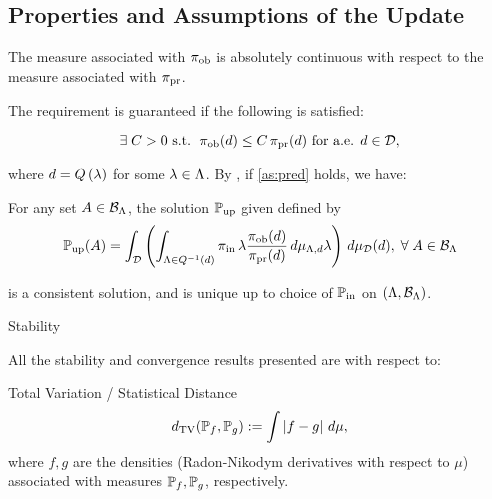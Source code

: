 \subsection{Properties and Assumptions of the Update}
\begin{frame}[t]
\begin{assumption}\label{as:pred}
	The measure associated with $\operatorname*{\pi_{ob}}$ is absolutely continuous with respect to the measure associated with $\operatorname*{\pi_{pr}}$.
\end{assumption}


The requirement is guaranteed if the following is satisfied:

\begin{equation}\label{eq:pred}
	\exists \; C>0 \text{ s.t. } \operatorname*{\pi_{ob}} (d) \leq C \operatorname*{\pi_{pr}} (d) \text{ for a.e. } d\in \mathcal{D},
\end{equation}

where $d = Q\left ( \lambda \right )$ for some $\lambda \in {\Lambda}$.
By \cite{BJW18}, if \eqref{as:pred} holds, we have:

\begin{theorem}
	For any set $A\in \mathcal{B}_{{\Lambda}}$, the solution $\operatorname*{\mathbb{P}_{up}}$ given defined by
	\begin{equation}\label{eq:cb_sol}
		\operatorname*{\mathbb{P}_{up}} (A) = \int_{\mathcal{D}} \left (  \int_{{\Lambda} \in Q^{-1}(d)}  \operatorname*{\pi_{in}}\lambda \frac{\operatorname*{\pi_{ob}}(d)}{\operatorname*{\pi_{pr}}(d)} \, d\mu_{{\Lambda}, d} \lambda \right ) \, d\mu_{\mathcal{D}}(d), \; \forall \; A \in \mathcal{B}_{{\Lambda}}
	\end{equation}

	is a consistent solution, and is unique up to choice of $\operatorname*{\mathbb{P}_{in}}$ on $({\Lambda}, \mathcal{B}_{{\Lambda}})$.
\end{theorem}

\end{frame}


\begin{frame}[t]{Stability}

All the stability and convergence results presented are with respect to:
\vspace{0.5in}

\begin{defn}{Total Variation / Statistical Distance}
	\begin{equation}\label{eq:tv}
		d_{\text{TV}} (\mathbb{P}_f, \mathbb{P}_g) := \int \left\vert f - g\right\vert \, d\mu,
	\end{equation}
where $f,g$ are the densities (Radon-Nikodym derivatives with respect to $\mu$) associated with measures $\mathbb{P}_f, \mathbb{P}_g$, respectively.
\end{defn}

\end{frame}

